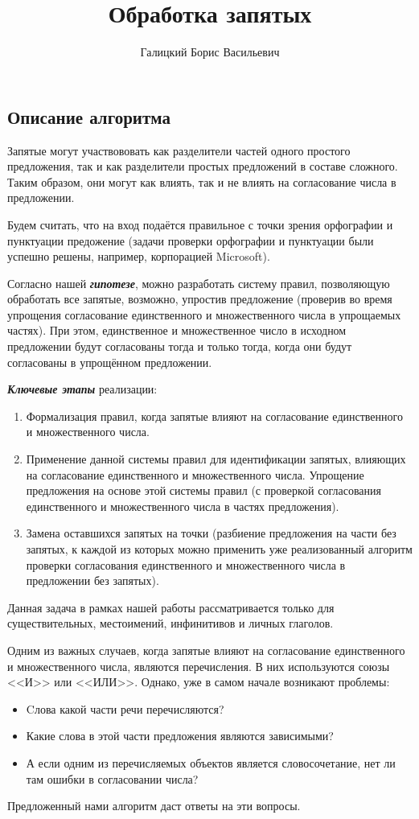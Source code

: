 \documentclass[a4paper,12pt]{article} %
\title{Обработка запятых}
\author{Галицкий Борис Васильевич}
\theoremstyle{definition}
\theoremstyle{plain}
\begin{document}
\maketitle

\subsection*{Описание алгоритма}

Запятые могут участвововать как разделители частей одного простого предложения, так и как разделители простых предложений в составе сложного. Таким образом, они могут как влиять, так и не влиять на согласование числа в предложении.

Будем считать, что на вход подаётся правильное с точки зрения орфографии и пунктуации предожение (задачи проверки орфографии и пунктуации были успешно решены, например, корпорацией Microsoft). 

Согласно нашей \textbf{\textit{гипотезе}}, можно разработать систему правил, позволяющую обработать все запятые, возможно, упростив предложение (проверив во время упрощения согласование единственного и множественного числа в упрощаемых частях). При этом, единственное и множественное число в исходном предложении будут согласованы тогда и только тогда, когда они будут согласованы в упрощённом предложении.

\textbf{\textit{Ключевые этапы}} реализации:
\begin{enumerate}
	\item Формализация правил, когда запятые влияют на согласование единственного и множественного числа.
	\item Применение данной системы правил для идентификации запятых, влияющих на согласование единственного и множественного числа. Упрощение предложения на основе этой системы правил (с проверкой согласования единственного и множественного числа в частях предложения).
	\item Замена оставшихся запятых на точки (разбиение предложения на части без запятых, к каждой из которых можно применить уже реализованный алгоритм проверки согласования единственного и множественного числа в предложении без запятых).
\end{enumerate}

Данная задача в рамках нашей работы рассматривается только для существительных, местоимений, инфинитивов и личных глаголов. 

Одним из важных случаев, когда запятые влияют на согласование единственного и множественного числа, являются перечисления. В них используются союзы <<И>> или <<ИЛИ>>. Однако, уже в самом начале возникают проблемы: \begin{itemize}
	\item Cлова какой части речи перечисляются? 
	\item Какие слова в этой части предложения являются зависимыми?
	\item А если одним из перечисляемых объектов является словосочетание, нет ли там ошибки в согласовании числа?
\end{itemize}
Предложенный нами алгоритм даст ответы на эти вопросы.
\end{document}
